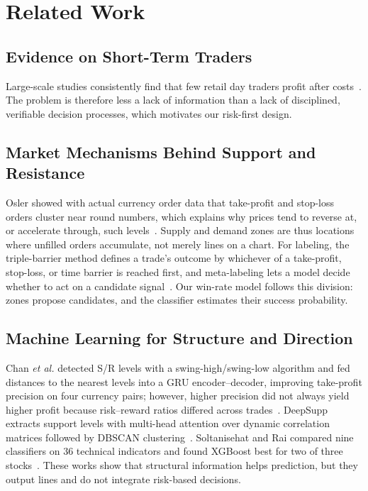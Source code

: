 \documentclass[conference]{IEEEtran}
\begin{document}
\section{Related Work}\label{sec:related}

\subsection{Evidence on Short-Term Traders}
Large-scale studies consistently find that few retail day traders profit after costs~\cite{barber2014speculator,chague2019daytrading}. The problem is therefore less a lack of information than a lack of disciplined, verifiable decision processes, which motivates our risk-first design.

\subsection{Market Mechanisms Behind Support and Resistance}
Osler showed with actual currency order data that take-profit and stop-loss orders cluster near round numbers, which explains why prices tend to reverse at, or accelerate through, such levels~\cite{osler2003currency}. Supply and demand zones are thus locations where unfilled orders accumulate, not merely lines on a chart. For labeling, the triple-barrier method defines a trade's outcome by whichever of a take-profit, stop-loss, or time barrier is reached first, and meta-labeling lets a model decide whether to act on a candidate signal~\cite{lopezdeprado2018advances}. Our win-rate model follows this division: zones propose candidates, and the classifier estimates their success probability.

\subsection{Machine Learning for Structure and Direction}
Chan \emph{et al.} detected S/R levels with a swing-high/swing-low algorithm and fed distances to the nearest levels into a GRU encoder--decoder, improving take-profit precision on four currency pairs; however, higher precision did not always yield higher profit because risk--reward ratios differed across trades~\cite{chan2022support}. DeepSupp extracts support levels with multi-head attention over dynamic correlation matrices followed by DBSCAN clustering~\cite{kriuk2025deepsupp}. Soltanisehat and Rai compared nine classifiers on 36 technical indicators and found XGBoost best for two of three stocks~\cite{soltanisehat2025multimodel}. These works show that structural information helps prediction, but they output lines and do not integrate risk-based decisions.
\end{document}
